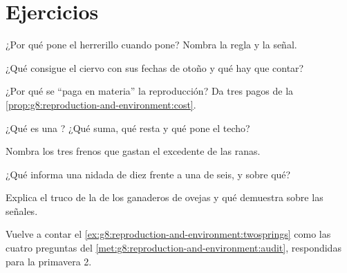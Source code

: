 \section{Ejercicios}

\begin{exercise}[$\star$]\label{exo:g8:reproduction-and-environment:1}
¿Por qué pone el herrerillo cuando pone? Nombra la regla y la señal.
\end{exercise}

\begin{exercise}[$\star$]\label{exo:g8:reproduction-and-environment:2}
¿Qué consigue el ciervo con sus fechas de otoño y qué hay que contar?
\end{exercise}

\begin{exercise}[$\star$]\label{exo:g8:reproduction-and-environment:3}
¿Por qué se ``paga en materia'' la reproducción? Da tres pagos de la
\cref{prop:g8:reproduction-and-environment:cost}.
\end{exercise}

\begin{exercise}[$\star$]\label{exo:g8:reproduction-and-environment:4}
¿Qué es una ? ¿Qué suma, qué resta y qué pone el techo?
\end{exercise}

\begin{exercise}[$\star$]\label{exo:g8:reproduction-and-environment:5}
Nombra los tres frenos que gastan el excedente de las ranas.
\end{exercise}

\begin{exercise}[$\star$]\label{exo:g8:reproduction-and-environment:6}
¿Qué informa una nidada de diez  frente a una de seis, y sobre
qué?
\end{exercise}

\begin{exercise}[$\star\star$]\label{exo:g8:reproduction-and-environment:7}
Explica el truco de la  de los ganaderos de ovejas y qué demuestra
sobre las señales.
\end{exercise}

\begin{exercise}[$\star\star$]\label{exo:g8:reproduction-and-environment:8}
Vuelve a contar el \cref{ex:g8:reproduction-and-environment:twosprings}
como las cuatro preguntas del
\cref{met:g8:reproduction-and-environment:audit}, respondidas para la
primavera 2.
\end{exercise}

